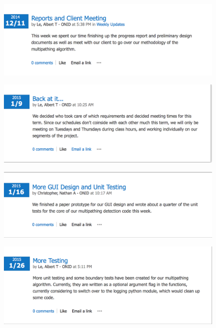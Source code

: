 \documentclass[12pt]{article}
\begin{document}
\begin{figure}[H]
\centering
\includegraphics[scale=0.5]{blog_posts/2014_12_11.png}
\end{figure}

\begin{figure}[H]
\centering
\includegraphics[scale=0.5]{blog_posts/2015_1_9.png}
\end{figure}

\begin{figure}[H]
\centering
\includegraphics[scale=0.5]{blog_posts/2015_1_16.png}
\label{fig:my_label}
\end{figure}

\begin{figure}[H]
\centering
\includegraphics[scale=0.5]{blog_posts/2015_1_26.png}
\label{fig:my_label}
\end{figure}
\end{document}
